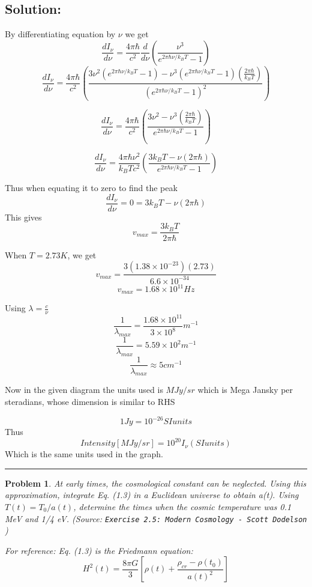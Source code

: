 \documentclass[11pt]{article}
\newenvironment{solution}{\subsection*{Solution:}}{\vspace{0.5cm} \hrule \vspace{0.7cm}}
\newtheorem{problem}{Problem}
\begin{document}
\begin{solution}
	By differentiating equation by $\nu$ we get
	$$ \frac{d I_\nu}{d\nu} = \frac{4\pi\hbar}{c^2} \frac{d}{d\nu}\left(
	\frac{\nu^3}{e^{2\pi\hbar\nu/k_BT} - 1}\right) $$
	$$ \frac{d I_\nu}{d\nu} =\frac{4\pi\hbar}{c^2} \left(
		\frac{3\nu^2 (e^{2\pi\hbar\nu/k_BT} - 1) - \nu^3
		(e^{2\pi\hbar\nu/k_BT} - 1) (\frac{2\pi\hbar}{k_B T})}{ (e^{2\pi\hbar\nu/k_BT} - 1)^2}
	\right)$$

	$$ \frac{d I_\nu}{d\nu} =\frac{4\pi\hbar}{c^2} \left(
		\frac{3\nu^2  - \nu^3
		(\frac{2\pi\hbar}{k_B T})}{ e^{2\pi\hbar\nu/k_BT} - 1}
	\right)$$


	$$ \frac{d I_\nu}{d\nu} =\frac{4\pi\hbar \nu^2}{k_B Tc^2} \left(
		\frac{3k_B T  - \nu
		(2\pi\hbar)}{ e^{2\pi\hbar\nu/k_BT} - 1}
	\right)$$

	Thus when equating it to zero to find the peak
	$$ \frac{d I_\nu}{d\nu} = 0 = 3k_B T  - \nu
	(2\pi\hbar)$$
	This gives $$ v_{max} = \frac{3k_B T}{2\pi \hbar} $$

	When $T = 2.73 K$, we get
	$$ v_{max} = \frac{3(1.38 \times 10^{-23}) (2.73)}{6.6 \times 10^{-34}} $$
	$$ v_{max} = 1.68 \times 10^{11} Hz $$

	Using $ \lambda = \frac{c}{\nu}$
	$$ \frac{1}{\lambda_{max}} = \frac{1.68 \times 10^{11}}{3\times 10^8}
	m^{-1} $$
	$$ \frac{1}{\lambda_{max}} = 5.59 \times 10^{2}m^{-1} $$
	$$ \frac{1}{\lambda_{max}} \approx 5 cm^{-1} $$

	Now in the given diagram the units used is $MJy/sr$ which is Mega Jansky
	per steradians, whose dimension is similar to RHS

	$$ 1 Jy = 10^{-26} SI units $$
	Thus
	$$ Intensity[MJy/sr] = 10^{20} I_\nu (SI units) $$
	Which is the same units used in the graph.


\end{solution}

\begin{problem}
	At early times, the cosmological constant can be neglected. Using this
	approximation, integrate Eq. (1.3) in a Euclidean universe to obtain a(t). Using
	$T (t) = T_0/a(t)$,
	determine the times when the cosmic temperature was 0.1 MeV and 1/4 eV.
	(Source: \texttt{Exercise 2.5: Modern Cosmology - Scott Dodelson} )

	For reference: Eq. (1.3) is the Friedmann equation:
	$$ H^2(t) = \frac{8\pi G}{3} \left[ \rho(t) + \frac{\rho_{cr} -
	\rho(t_0)}{a(t)^2} \right] $$
\end{problem}
\end{document}
